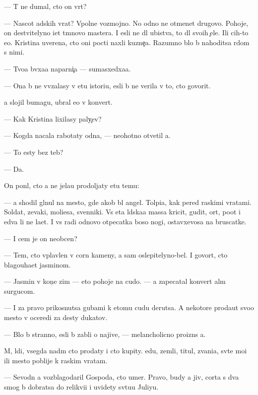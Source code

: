 \documentclass[10pt]{book}
\begin{document}
— T{\yi} ne dumal, cto on vr{\e}t?

— Nascot adskih vrat? Vpolne vozmojno. No odno ne otmen{\ia}{\y}et drugovo. Pohoje, on de{\y}stvitelyno i{\x}et t{\e}mnovo mastera. I {\y}esli ne dl{\ia} ubi{\y}stva, to dl{\ia} svo{\y}ih {\c}ele{\y}. Ili c{\y}ih-to {\y}e{\x}o. Kristina uverena, cto oni pocti naxli kuzne{\c}a. Razumno b{\yi}lo b{\yi} nahoditsa r{\ia}dom s nimi.

— Tvo{\y}a b{\yi}vxa{\y}a naparni{\c}a — sumasxedxa{\y}a.

— Ona b{\yi} ne vv{\ia}zalasy v etu istori{\y}u, {\y}esli b{\yi} ne verila v to, cto govorit.

{\Y}a slojil bumagu, ubral {\y}e{\y}o v konvert.

— Kak Kristina lixilasy paly{\c}ev?

— Kogda nacala rabotaty odna, — neohotno otvetil {\y}a.

— To {\y}esty bez teb{\ia}?

— Da.

On pon{\ia}l, cto {\y}a ne jela{\y}u prodoljaty etu temu:

— {\Y}a shodil gl{\ia}nul na mesto, gde {\y}akob{\yi} b{\yi}l angel. Tolpi{\x}a, kak pered ra{\y}skimi vratami. Soldat{\yi}, zevaki, mol{\ia}{\x}i{\y}esa, sv{\ia}{\x}enniki. Vs{\ia} eta l{\io}dska{\y}a massa kricit, gudit, or{\e}t, po{\y}ot i {\y}edva li ne la{\y}et. I vs{\e} radi odnovo otpecatka boso{\y} nogi, ostav\-xe\-vosa na bruscatke.

— I cem je on neob{\yi}cen?

— Tem, cto vplavlen v corn{\yi}{\y} kameny, a sam oslepitelyno-bel. I govor{\ia}t, cto blagouha{\y}et jasminom.

— Jasmin v kon{\c}e zim{\yi} — eto pohoje na cudo. — {\Y}a zapecatal konvert al{\yi}m surgucom.

— I za pravo prikosnutsa gubami k etomu cudu derutsa. A nekotor{\yi}{\y}e proda{\y}ut svo{\y}o mesto v oceredi za des{\ia}ty dukatov.

— B{\yi}lo b{\yi} stranno, {\y}esli b{\yi} zab{\yi}li o najive, — melancholicno proizn{\e}s {\y}a.

M{\yi}, l{\io}di, vsegda na{\y}d{\e}m cto prodaty i cto kupity. {\Y}edu, zemli, titul{\yi}, zvani{\y}a, sv{\ia}t{\yi}{\y}e mo{\x}i ili mesto poblije k ra{\y}skim vratam.

— Sevodn{\ia} {\y}a vozblagodaril Gospoda, cto umer. Pravo, budy {\y}a jiv, corta s dva smog b{\yi} dobratsa do relikvi{\y}i i uvidety sv{\ia}tu{\y}u Juliyu.
\end{document}
